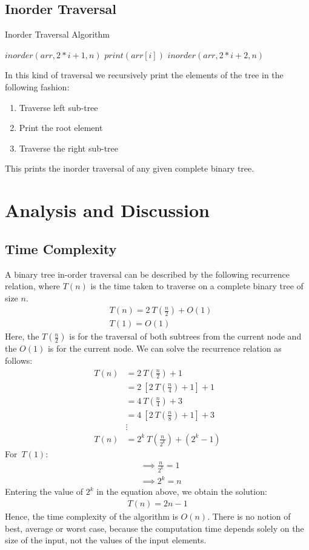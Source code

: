 \documentclass[letterpaper, 12 pt, conference]{ieeeconf}  %
\begin{document}
\subsection{Inorder Traversal}
\begin{algorithm}[H]
\caption{Inorder Traversal Algorithm}\label{alg:inorder}
\begin{algorithmic}
  \State $inorder(arr, 2*i + 1, n)$
  \State $print(arr[i])$
  \State $inorder(arr, 2*i + 2, n)$
\EndIf
\EndProcedure
\end{algorithmic}
\end{algorithm}
In this kind of traversal we recursively print the elements of the tree in the following fashion:
\begin{enumerate}
\item Traverse left sub-tree
\item Print the root element
\item Traverse the right sub-tree
\end{enumerate}
This prints the inorder traversal of any given complete binary tree.

\section{Analysis and Discussion}
\subsection{Time Complexity}
A binary tree in-order traversal can be described by the following recurrence relation, where $T(n)$ is the time taken to traverse on a complete binary tree of size $n$.
\begin{align*}
&T(n) = 2\ T(\frac{n}{2}) + O(1) \\
&T(1) = O(1)
\end{align*}
Here, the $T(\frac{n}{2})$ is for the traversal of both subtrees from the current node and the $O(1)$ is for the current node. We can solve the recurrence relation as follows:
\begin{align*}
T(n) &= 2\ T(\frac{n}{2}) + 1 \\
&= 2\ [2\ T(\frac{n}{4}) + 1] + 1 \\
&= 4\ T(\frac{n}{4}) + 3 \\
&= 4\ [2\ T(\frac{n}{8}) + 1] + 3 \\
&\vdots \\
T(n) &= 2^k\ T(\frac{n}{2^k}) + (2^k - 1)
\end{align*}
For\ $T(1)$:
\begin{align*}
&\implies \frac{n}{2^k} = 1 \\
&\implies 2^k = n
\end{align*}
Entering the value of $2^k$ in the equation above, we obtain the solution:
\begin{align*}
T(n) = 2n - 1
\end{align*}
Hence, the time complexity of the algorithm is $O(n)$. There is no notion of best, average or worst case, because the computation time depends solely on the size of the input, not the values of the input elements.
\end{document}
